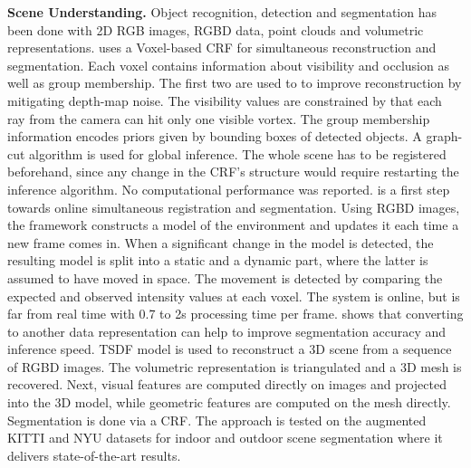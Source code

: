 \documentclass{llncs}
\begin{document}
  \noindent
  \textbf{Scene Understanding.} Object recognition, detection and segmentation has been done with 2D RGB images, RGBD data, point clouds and volumetric representations. \cite{VCRF} uses a Voxel-based CRF for simultaneous reconstruction and segmentation. Each voxel contains information about visibility and occlusion as well as group membership. The first two are used to to improve reconstruction by mitigating depth-map noise. The visibility values are constrained by that each ray from the camera can hit only one visible vortex. The group membership information encodes priors given by bounding boxes of detected objects. A graph-cut algorithm is used for global inference. The whole scene has to be registered beforehand, since any change in the CRF's structure would require restarting the inference algorithm. No computational performance was reported. \cite{ChangeDetection} is a first step towards online simultaneous registration and segmentation. Using RGBD images, the framework constructs a model of the environment and updates it each time a new frame comes in. When a significant change in the model is detected, the resulting model is split into a static and a dynamic part, where the latter is assumed to have moved in space. The movement is detected by comparing the expected and observed intensity values at each voxel. The system is online, but is far from real time with 0.7 to 2s processing time per frame. \cite{mesh} shows that converting to another data representation can help to improve segmentation accuracy and inference speed. TSDF model is used to reconstruct a 3D scene from a sequence of RGBD images. The volumetric representation is triangulated and a 3D mesh is recovered. Next, visual features are computed directly on images and projected into the 3D model, while geometric features are computed on the mesh directly. Segmentation is done via a CRF. The approach is tested on the augmented KITTI and NYU datasets for indoor and outdoor scene segmentation where it delivers state-of-the-art results. 
      
  
    
\end{document}
